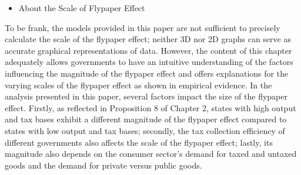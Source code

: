 \begin{itemize}
    \item About the Scale of Flypaper Effect
\end{itemize}

To be frank, the models provided in this paper are not sufficient to precisely calculate the scale of the flypaper effect; neither 3D nor 2D graphs can serve as accurate graphical representations of data. However, the content of this chapter adequately allows governments to have an intuitive understanding of the factors influencing the magnitude of the flypaper effect and offers explanations for the varying scales of the flypaper effect as shown in empirical evidence. In the analysis presented in this paper, several factors impact the size of the flypaper effect. Firstly, as reflected in Proposition 8 of Chapter 2, states with high output and tax bases exhibit a different magnitude of the flypaper effect compared to states with low output and tax bases; secondly, the tax collection efficiency of different governments also affects the scale of the flypaper effect; lastly, its magnitude also depends on the consumer sector's demand for taxed and untaxed goods and the demand for private versus public goods.